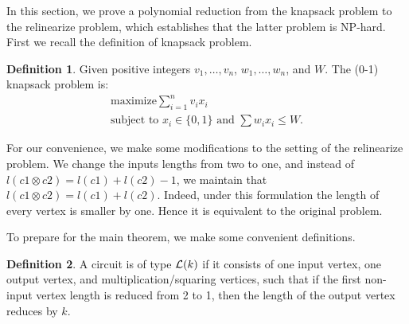 \documentclass[11pt]{article} %
\theoremstyle{plain}
\theoremstyle{definition}
\newtheorem{definition}{Definition}
\begin{document}
In this section, we prove a polynomial reduction from the knapsack problem to the relinearize problem, which establishes that the latter problem is NP-hard.  First we recall the definition of  knapsack problem. 


\begin{definition}
Given positive integers $v_1, \ldots, v_n$, $w_1, \ldots ,w_n$, and $W$. The (0-1) knapsack problem is:
\begin{align*}
\mbox{maximize} \sum_{i=1}^{n} v_i x_i \\
\mbox{subject to } x_i \in \{0,1\}
\mbox{ and }  \sum w_i x_i \leq W. 
\end{align*}
\end{definition}




For our convenience, we make some modifications to the setting of the relinearize problem. We change the inputs lengths from two to one, and instead of $l(c1 \otimes c2) = l(c1) + l(c2)-1$, we maintain that $l(c1 \otimes c2) = l(c1) + l(c2)$.  Indeed, under this formulation  the length of every vertex is smaller by one. Hence it is equivalent to the original problem.



To prepare for the main theorem, we make some convenient definitions.  
\begin{definition}
A circuit is of type $\mathcal{L}(k)$ if it consists of one input vertex, one output vertex, and multiplication/squaring vertices, such that if the first non-input vertex length is reduced from 2 to 1, then the length of the output vertex reduces by $k$.  
\end{definition}
\end{document}
